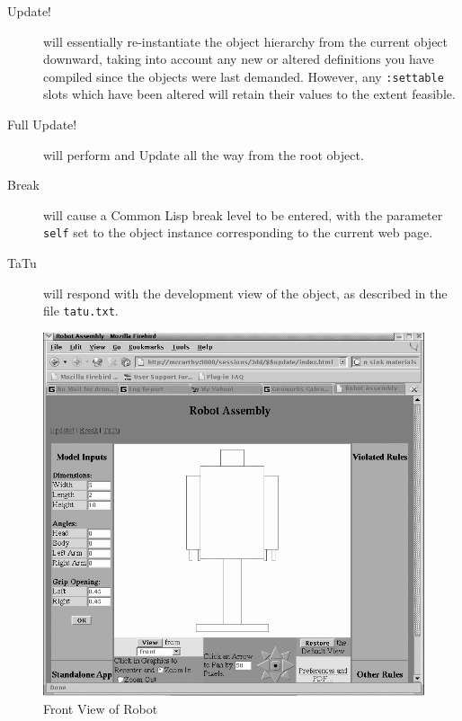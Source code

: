 \documentclass [11pt]{book}
\begin{document}
\begin{description}

\item [Update!]
will essentially re-instantiate the object hierarchy from the current object downward, taking into account any new or altered
definitions you have compiled since the objects were last demanded. However, any \texttt{:settable} slots which have been altered will retain their values to the extent feasible.

\item [Full Update!]
will perform and Update all the way from the root object.

\item [Break]
will cause a Common Lisp break level to be entered, with the parameter \texttt{self} set to the object instance corresponding to the current web page.

\item [TaTu]
will respond with the development view of the object, as described in the file \texttt{tatu.txt}.

\end{description}


\begin{figure}
\begin{center}
\includegraphics{../images/robot-front.png}
\end{center}

\caption{Front View of Robot}

\label{fig:robot-front}

\end{figure}
\end{document}
